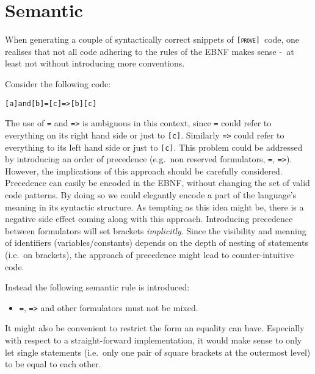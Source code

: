 \documentclass[british]{article}
\newcommand\prv{bc}
\newcommand\m[1]{\texttt{#1}}
\newcommand\name{\texttt{\textsc{[prove]}}}
\begin{document}
\pagebreak{}

\section{Semantic}

When generating a couple of syntactically correct snippets of \name\ code, one
realises that not all code adhering to the rules of the EBNF makes sense -\ at
least not without introducing more conventions.

\medskip{}

Consider the following code:

\begin{verbatim}
[a]and[b]=[c]=>[b][c]
\end{verbatim}

The use of \m{=} and \m{=>} is ambiguous in this context, since \m{=} could
refer to everything on its right hand side or just to \m{[c]}. Similarly \m{=>}
could refer to everything to its left hand side or just to \m{[c]}. This problem
could be addressed by introducing an order of precedence (e.g.\ non reserved
formulators, \m{=}, \m{=>}). However, the implications of this approach should
be carefully considered. Precedence can easily be encoded in the EBNF, without
changing the set of valid code patterns. By doing so we could elegantly encode a
part of the language's meaning in its syntactic structure. As tempting as this
idea might be, there is a negative side effect coming along with this approach.
Introducing precedence between formulators will set brackets \emph{implicitly}.
Since the visibility and meaning of identifiers (variables/constants) depends on
the depth of nesting of statements (i.e.\ on brackets), the approach of
precedence might lead to counter-intuitive code.\newline 

Instead the following semantic rule is introduced:
\begin{itemize}
	\item \m{=}, \m{=>} and other formulators must not be mixed.%
\end{itemize}

\medskip{}

It might also be convenient to restrict the form an equality can have.
Especially with respect to a straight-forward implementation, it would
make sense to only let single statements (i.e.\ only one pair of square
brackets at the outermost level) to be equal to each other.\newline
\end{document}
